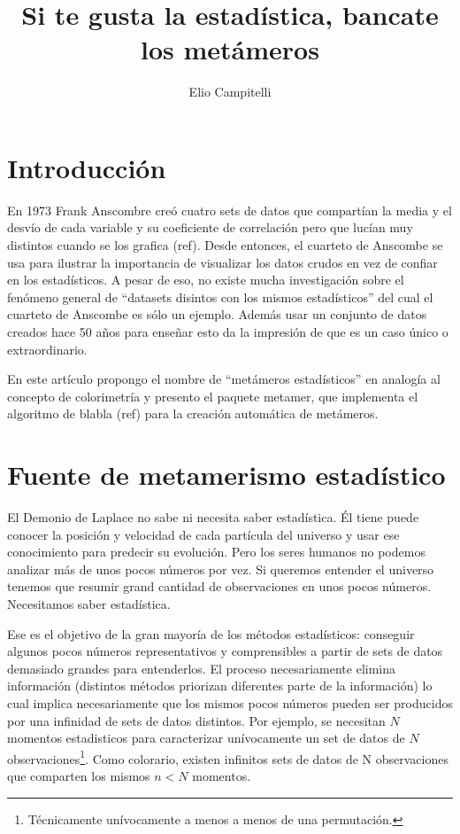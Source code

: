 \documentclass[runningheads,en-GB]{llncs}
\begin{document}
%
\title{Si te gusta la estadística, bancate los metámeros}
%
%
\author{
Elio Campitelli }



%
\maketitle
%

 



\section{Introducción}

En 1973 Frank Anscombre creó cuatro sets de datos que compartían la
media y el desvío de cada variable y su coeficiente de correlación pero
que lucían muy distintos cuando se los grafica (ref). Desde entonces, el
cuarteto de Anscombe se usa para ilustrar la importancia de visualizar
los datos crudos en vez de confiar en los estadísticos. A pesar de eso,
no existe mucha investigación sobre el fenómeno general de ``datasets
disintos con los mismos estadísticos'' del cual el cuarteto de Anscombe
es sólo un ejemplo. Además usar un conjunto de datos creados hace 50
años para enseñar esto da la impresión de que es un caso único o
extraordinario.

En este artículo propongo el nombre de ``metámeros estadísticos'' en
analogía al concepto de colorimetría y presento el paquete metamer, que
implementa el algoritmo de blabla (ref) para la creación automática de
metámeros.

\section{Fuente de metamerismo estadístico}

El Demonio de Laplace no sabe ni necesita saber estadística. Él tiene
puede conocer la posición y velocidad de cada partícula del universo y
usar ese conocimiento para predecir su evolución. Pero los seres humanos
no podemos analizar más de unos pocos números por vez. Si queremos
entender el universo tenemos que resumir grand cantidad de observaciones
en unos pocos números. Necesitamos saber estadística.

Ese es el objetivo de la gran mayoría de los métodos estadísticos:
conseguir algunos pocos números representativos y comprensibles a partir
de sets de datos demasiado grandes para entenderlos. El proceso
necesariamente elimina información (distintos métodos priorizan
diferentes parte de la información) lo cual implica necesariamente que
los mismos pocos números pueden ser producidos por una infinidad de sets
de datos distintos. Por ejemplo, se necesitan \(N\) momentos
estadisticos para caracterizar unívocamente un set de datos de \(N\)
observaciones\footnote{Técnicamente unívocamente a menos a menos de una permutación.}.
Como colorario, existen infinitos sets de datos de N observaciones que
comparten los mismos \(n < N\) momentos.
\end{document}
